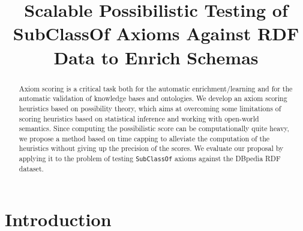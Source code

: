 \documentclass[conference]{IEEEtran}
\begin{document}
\title{Scalable Possibilistic Testing of SubClassOf Axioms Against RDF Data to Enrich Schemas}



\author{
  \and
  \and
}

\maketitle

\begin{abstract}
Axiom scoring is a critical task both for the automatic enrichment/learning
and for the automatic validation of knowledge bases and ontologies.
We develop an axiom scoring heuristics based on possibility theory,
which aims at overcoming some limitations of scoring heuristics based on statistical inference
and working with open-world semantics.
Since computing the possibilistic score can be computationally quite heavy, we propose a method based on time capping
to alleviate the computation of the heuristics without giving up the precision of the scores.
We evaluate our proposal by applying it to the problem of testing \texttt{SubClassOf}
axioms against the DBpedia RDF dataset.
\end{abstract}


\IEEEpeerreviewmaketitle

\section{Introduction}
\end{document}
